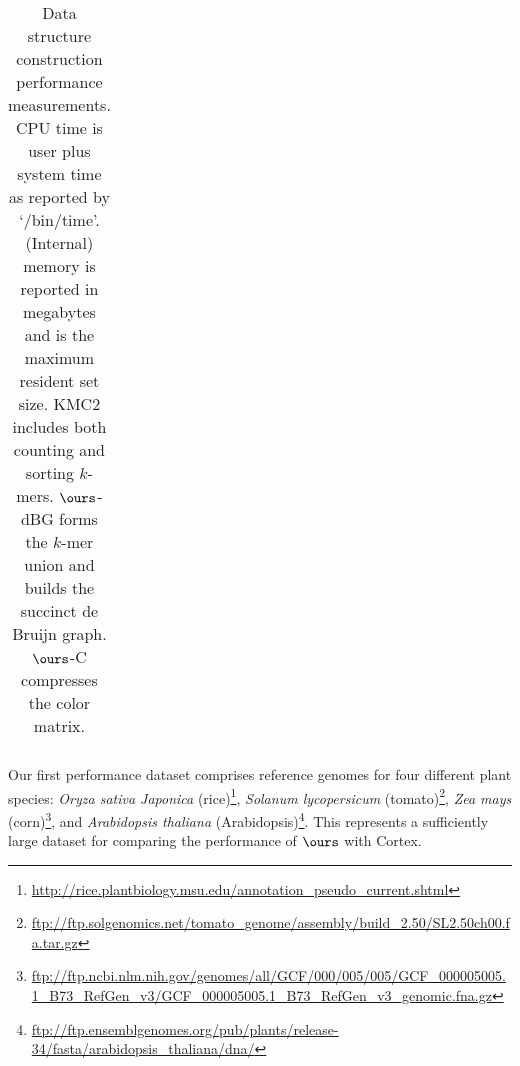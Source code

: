\begin{sidewaystable}
\begin{tabular}{|c|r|r|r|r|r|r|r|r|r|}
    \hline
   \end{tabular}
       \caption{Data structure construction performance measurements.  CPU time is user plus system time as reported by `/bin/time'.  (Internal) memory is reported in megabytes and is the maximum resident set size. KMC2 includes both counting and sorting $k$-mers. $\ours$-dBG forms the $k$-mer union and builds the succinct de Bruijn graph. $\ours$-C compresses the color matrix.}
  \label{tbl-buildper}

      \end{sidewaystable}





    

    

    Our first performance dataset comprises reference genomes for four different plant species:
    \emph{Oryza sativa Japonica} (rice)\footnote{\url{http://rice.plantbiology.msu.edu/annotation_pseudo_current.shtml}}\citep{rice},
    \emph{Solanum lycopersicum} (tomato)\footnote{\url{ftp://ftp.solgenomics.net/tomato_genome/assembly/build_2.50/SL2.50ch00.fa.tar.gz}}\citep{tomato1,tomato2},
    \emph{Zea mays} (corn)\footnote{\url{ftp://ftp.ncbi.nlm.nih.gov/genomes/all/GCF/000/005/005/GCF_000005005.1_B73_RefGen_v3/GCF_000005005.1_B73_RefGen_v3_genomic.fna.gz}}\citep{corn}, and
    \emph{Arabidopsis thaliana} (Arabidopsis)\footnote{\url{ftp://ftp.ensemblgenomes.org/pub/plants/release-34/fasta/arabidopsis_thaliana/dna/}}\citep{swarbreck}.
    This represents a sufficiently large dataset for comparing the performance of $\ours$ with {\sc Cortex}.  

